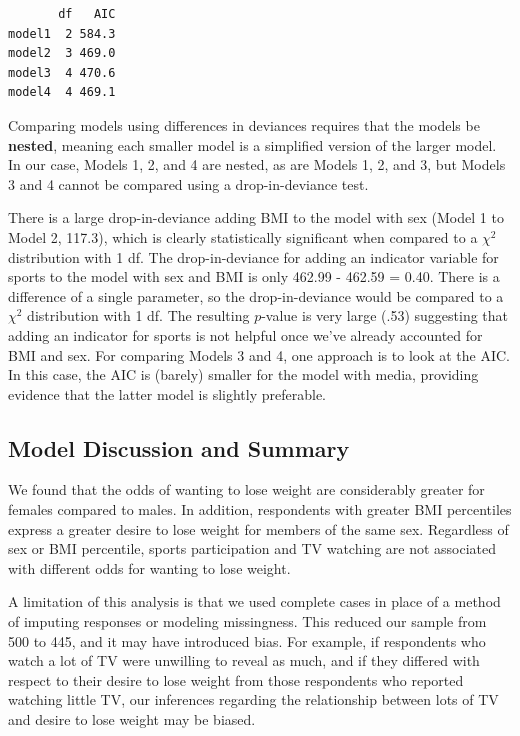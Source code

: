 \documentclass[
]{krantz}
\begin{document}
\begin{verbatim}
       df   AIC
model1  2 584.3
model2  3 469.0
model3  4 470.6
model4  4 469.1
\end{verbatim}

Comparing models using differences in deviances requires that the models be \textbf{nested}, meaning each smaller model is a simplified version of the larger model. In our case, Models 1, 2, and 4 are nested, as are Models 1, 2, and 3, but Models 3 and 4 cannot be compared using a drop-in-deviance test.

There is a large drop-in-deviance adding BMI to the model with sex (Model 1 to Model 2, 117.3), which is clearly statistically significant when compared to a \(\chi^2\) distribution with 1 df. The drop-in-deviance for adding an indicator variable for sports to the model with sex and BMI is only 462.99 - 462.59 = 0.40. There is a difference of a single parameter, so the drop-in-deviance would be compared to a \(\chi^2\) distribution with 1 df. The resulting \(p\)-value is very large (.53) suggesting that adding an indicator for sports is not helpful once we've already accounted for BMI and sex. For comparing Models 3 and 4, one approach is to look at the AIC. In this case, the AIC is (barely) smaller for the model with media, providing evidence that the latter model is slightly preferable.

\hypertarget{model-discussion-and-summary}{%
\subsection{Model Discussion and Summary}\label{model-discussion-and-summary}}

We found that the odds of wanting to lose weight are considerably greater for females compared to males. In addition, respondents with greater BMI percentiles express a greater desire to lose weight for members of the same sex. Regardless of sex or BMI percentile, sports participation and TV watching are not associated with different odds for wanting to lose weight.

A limitation of this analysis is that we used complete cases in place of a method of imputing responses or modeling missingness. This reduced our sample from 500 to 445, and it may have introduced bias. For example, if respondents who watch a lot of TV were unwilling to reveal as much, and if they differed with respect to their desire to lose weight from those respondents who reported watching little TV, our inferences regarding the relationship between lots of TV and desire to lose weight may be biased.
\end{document}
